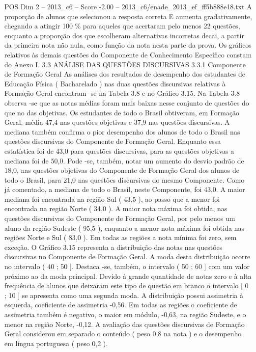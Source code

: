\begin{textsample}{POS Dim 2 – 2013\_c6 – Score -2.00 – 2013\_c6/enade\_2013\_ef\_ff5b888e18.txt}
A proporção de alunos que selecionou a resposta correta E aumenta gradativamente, chegando a atingir 100 \% para aqueles que acertaram pelo menos 22 questões, enquanto a proporção dos que escolheram alternativas incorretas decai, a partir da primeira nota não nula, como função da nota nesta parte da prova.
Os gráficos relativos às demais questões do Componente de Conhecimento Específico constam do Anexo I. 3.3 ANÁLISE DAS QUESTÕES DISCURSIVAS 3.3.1 Componente de Formação Geral As análises dos resultados de desempenho dos estudantes de Educação Física ( Bacharelado ) nas duas questões discursivas relativas à Formação Geral encontram -se na Tabela 3.8 e no Gráfico 3.15.
Na Tabela 3.8 observa -se que as notas médias foram mais baixas nesse conjunto de questões do que no das objetivas.
Os estudantes de todo o Brasil obtiveram, em Formação Geral, média 47,4 nas questões objetivas e 37,9 nas questões discursivas.
A mediana também confirma o pior desempenho dos alunos de todo o Brasil nas questões discursivas do Componente de Formação Geral.
Enquanto essa estatística foi de 43,0 para questões discursivas, para as questões objetivas a mediana foi de 50,0.
Pode -se, também, notar um aumento do desvio padrão de 18,0, nas questões objetivas do Componente de Formação Geral dos alunos de todo o Brasil, para 21,0 nas questões discursivas do mesmo Componente.
Como já comentado, a mediana de todo o Brasil, neste Componente, foi 43,0.
A maior mediana foi encontrada na região Sul ( 43,5 ), ao passo que a menor foi encontrada na região Norte ( 34,0 ).
A maior nota máxima foi obtida, nas questões discursivas do Componente de Formação Geral, por pelo menos um aluno da região Sudeste ( 95,5 ), enquanto a menor nota máxima foi obtida nas regiões Norte e Sul ( 83,0 ).
Em todas as regiões a nota mínima foi zero, sem exceção.
O Gráfico 3.15 representa a distribuição das notas nas questões discursivas no Componente de Formação Geral.
A moda desta distribuição ocorre no intervalo ( 40 ; 50 ].
Destaca -se, também, o intervalo ( 50 ; 60 ] com um valor próximo ao da moda principal.
Devido à grande quantidade de notas zero e à alta frequência de alunos que deixaram este tipo de questão em branco o intervalo [ 0 ; 10 ] se apresenta como uma segunda moda.
A distribuição possui assimetria à esquerda, coeficiente de assimetria -0,56.
Em todas as regiões o coeficiente de assimetria também é negativo, o maior em módulo, -0,63, na região Sudeste, e o menor na região Norte, -0,12.
A avaliação das questões discursivas de Formação Geral considerou em separado o conteúdo ( peso 0,8 na nota ) e o desempenho em língua portuguesa ( peso 0,2 ).

\end{textsample}
